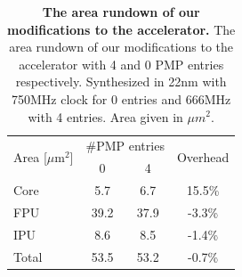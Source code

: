\begin{table}[tbp]
\centering
\caption[The area rundown of our modifications to the accelerator]{\textbf{The area rundown of our modifications to the accelerator.} The area rundown of our modifications to the accelerator with 4 and 0 PMP entries respectively. Synthesized in 22nm with 750MHz clock for 0 entries and 666MHz with 4 entries. Area given in $\mu m^2$.}
\label{tab:areasnitch}
\begin{tabular}{@{}lccc@{}}
\toprule
\multirow{2}{*}{Area {[}$\mu$m$^2${]}} & \multicolumn{2}{c}{\#PMP entries} & \multirow{2}{*}{Overhead} \\ & 0                 & 4                 &\\ \midrule
Core   & 5.7               & 6.7               & 15.5\%                    \\
FPU    & 39.2              & 37.9              & -3.3\%                    \\
IPU   & 8.6               & 8.5               & -1.4\%                    \\ \midrule
Total  & 53.5              & 53.2              & -0.7\%                    \\ \bottomrule
\end{tabular}
\end{table}

% 

\setcounter{para}{0}



